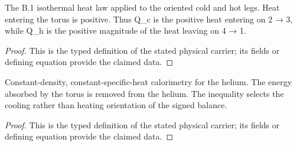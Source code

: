 \begin{definition}
  \label{def:physics:IPhO_2026_3_C_3:aux018}
  The B.1 isothermal heat law applied to the oriented cold and hot legs. Heat entering the torus is positive. Thus Q\_c is the positive heat entering on 2 → 3, while Q\_h is the positive magnitude of the heat leaving on 4 → 1.
\end{definition}
\begin{proof}
  This is the typed definition of the stated physical carrier; its fields or defining equation provide the claimed data.
\end{proof}

\begin{definition}
  \label{def:physics:IPhO_2026_3_C_3:aux019}
  Constant-density, constant-specific-heat calorimetry for the helium. The energy absorbed by the torus is removed from the helium. The inequality selects the cooling rather than heating orientation of the signed balance.
\end{definition}
\begin{proof}
  This is the typed definition of the stated physical carrier; its fields or defining equation provide the claimed data.
\end{proof}

